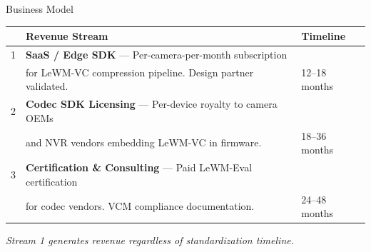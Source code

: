 \documentclass[aspectratio=169, professionalfonts, 10pt]{beamer}
\begin{document}
\begin{frame}{Business Model}

  \begin{tabular}{@{}lll@{}}
    \toprule
    & \textbf{Revenue Stream} & \textbf{Timeline} \\
    \midrule
    1 & \textbf{SaaS / Edge SDK} --- Per-camera-per-month subscription \\
      & for LeWM-VC compression pipeline. Design partner validated. & 12--18 months \\
    \midrule
    2 & \textbf{Codec SDK Licensing} --- Per-device royalty to camera OEMs \\
      & and NVR vendors embedding LeWM-VC in firmware. & 18--36 months \\
    \midrule
    3 & \textbf{Certification \& Consulting} --- Paid LeWM-Eval certification \\
      & for codec vendors. VCM compliance documentation. & 24--48 months \\
    \bottomrule
  \end{tabular}

  \bigskip
  \begin{center}
    \small
    \textit{Stream 1 generates revenue regardless of standardization timeline.}
  \end{center}
\end{frame}
\end{document}
